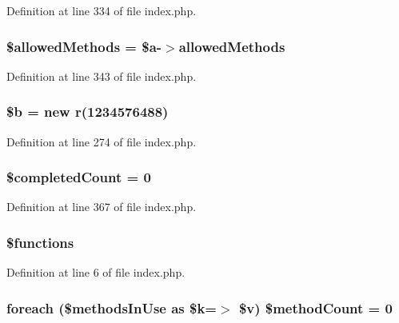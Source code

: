 Definition at line 334 of file index.\-php.

\hypertarget{index_8php_ab278eba7cab5341dacdccecd7a2cc2df}{
\subsubsection[{\$allowed\-Methods}]{\setlength{\rightskip}{0pt plus 5cm}\$allowed\-Methods = \$a-\/$>$allowed\-Methods}}\label{index_8php_ab278eba7cab5341dacdccecd7a2cc2df}


Definition at line 343 of file index.\-php.

\hypertarget{index_8php_ab9eb087b791749ae45deabb0899b7ccc}{
\subsubsection[{\$b}]{\setlength{\rightskip}{0pt plus 5cm}\$b = new {\bf r}(1234576488)}}\label{index_8php_ab9eb087b791749ae45deabb0899b7ccc}


Definition at line 274 of file index.\-php.

\hypertarget{index_8php_a51c734a41c7747051953ec3d78dd1c5b}{
\subsubsection[{\$completed\-Count}]{\setlength{\rightskip}{0pt plus 5cm}\$completed\-Count = 0}}\label{index_8php_a51c734a41c7747051953ec3d78dd1c5b}


Definition at line 367 of file index.\-php.

\hypertarget{index_8php_aa75daea491817f3b64daa2f51128bcdf}{
\subsubsection[{\$functions}]{\setlength{\rightskip}{0pt plus 5cm}\$functions}}\label{index_8php_aa75daea491817f3b64daa2f51128bcdf}


Definition at line 6 of file index.\-php.

\hypertarget{index_8php_a56c1b7384519355df73a254a12f0bae3}{
\subsubsection[{\$method\-Count}]{\setlength{\rightskip}{0pt plus 5cm}foreach (\$methods\-In\-Use as \$k=$>$ \$v) \$method\-Count = 0}}\label{index_8php_a56c1b7384519355df73a254a12f0bae3}


